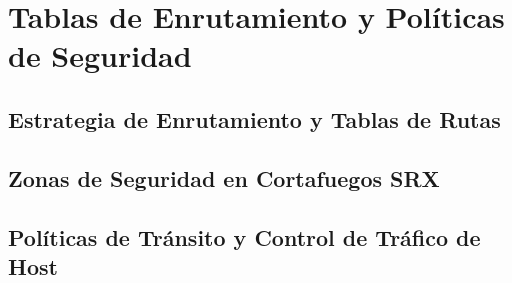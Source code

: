 \section{Tablas de Enrutamiento y Políticas de Seguridad}
\label{sec:enrutamiento_seguridad}

\subsection{Estrategia de Enrutamiento y Tablas de Rutas}
\label{subsec:estrategia_enrutamiento}

\subsection{Zonas de Seguridad en Cortafuegos SRX}
\label{subsec:zonas_seguridad}

\subsection{Políticas de Tránsito y Control de Tráfico de Host}
\label{subsec:politicas_seguridad}

